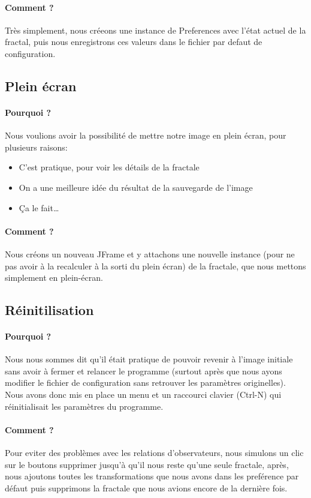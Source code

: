 \documentclass[a4paper]{report}
\begin{document}
\paragraph{Comment ?}
Très simplement, nous créeons une instance de Preferences avec l'état actuel de la fractal, puis nous enregistrons ces valeurs dans le fichier par defaut de configuration.

\subsection*{Plein écran}
\paragraph{Pourquoi ?}
Nous voulions avoir la possibilité de mettre notre image en plein écran, pour plusieurs raisons:
\begin{itemize}
\item C'est pratique, pour voir les détails de la fractale
\item On a une meilleure idée du résultat de la sauvegarde de l'image
\item Ça le fait\ldots
\end{itemize}

\paragraph{Comment ?}
Nous créons un nouveau JFrame et y attachons une nouvelle instance (pour ne pas avoir à la recalculer à la sorti du plein écran) de la fractale, que nous mettons simplement en plein-écran.

\subsection*{Réinitilisation}
\paragraph{Pourquoi ?}
Nous nous sommes dit qu'il était pratique de pouvoir revenir à l'image initiale sans avoir à fermer et relancer le programme (surtout après que nous ayons modifier le fichier de configuration sans retrouver les paramètres originelles). Nous avons donc mis en place un menu et un raccourci clavier (Ctrl-N) qui réinitialisait les paramètres du programme.

\paragraph{Comment ?}
Pour eviter des problèmes avec les relations d'observateurs, nous simulons un clic sur le boutons supprimer jusqu'à qu'il nous reste qu'une seule fractale, après, nous ajoutons toutes les transformations que nous avons dans les preférence par défaut puis supprimons la fractale que nous avions encore de la dernière fois.
\end{document}

